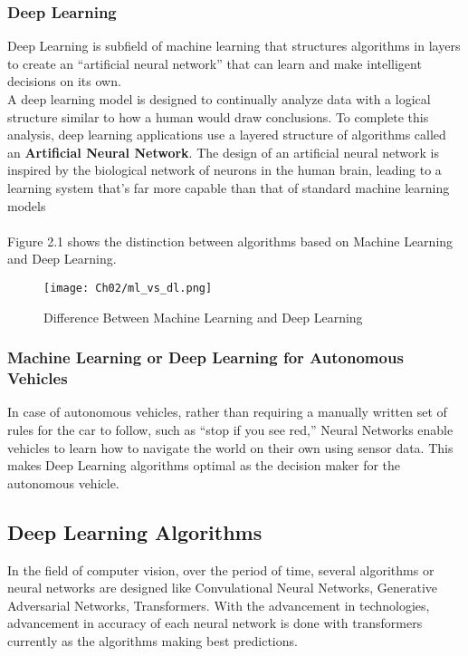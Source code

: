 \subsubsection{Deep Learning}
Deep Learning is subfield of machine learning that structures algorithms in layers to create an “artificial neural network” that can learn and make intelligent decisions on its own.
\\
A deep learning model is designed to continually analyze data with a logical structure similar to how a human would draw conclusions. To complete this analysis, deep learning applications use a layered structure of algorithms called an \textbf{Artificial Neural Network}. The design of an artificial neural network is inspired by the biological network of neurons in the human brain, leading to a learning system that's far more capable than that of standard machine learning models
\\
\\
Figure 2.1 shows the distinction between algorithms based on Machine Learning and Deep Learning.

\begin{figure}[h]
    \centering
    \texttt{[image: Ch02/ml\_vs\_dl.png]}
    \caption{Difference Between Machine Learning and Deep Learning}
    \label{figure:9}
\end{figure}
\FloatBarrier

\subsubsection{Machine Learning or Deep Learning for Autonomous Vehicles}
In case of autonomous vehicles, rather than requiring a manually written set of rules for the car to follow, such as “stop if you see red,” Neural Networks enable vehicles to learn how to navigate the world on their own using sensor data. This makes Deep Learning algorithms optimal as the decision maker for the autonomous vehicle. 

\subsection{Deep Learning Algorithms}
In the field of computer vision, over the period of time, several algorithms or neural networks are designed like Convulational Neural Networks, Generative Adversarial Networks, Transformers. With the advancement in technologies, advancement in accuracy of each neural network is done with transformers currently as the algorithms making best predictions.

